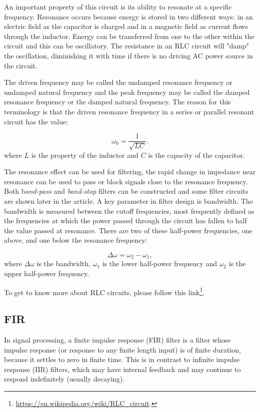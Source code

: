 \documentclass[12pt]{article}
\theoremstyle{plain}
\begin{document}
An important property of this circuit is its ability to resonate at a specific frequency. Resonance occurs because energy is stored in two different ways: in an electric field as the capacitor is charged and in a magnetic field as current flows through the inductor. Energy can be transferred from one to the other within the circuit and this can be oscillatory. The resistance in an RLC circuit will "damp" the oscillation, diminishing it with time if there is no driving AC power source in the circuit. 

The driven frequency may be called the undamped resonance frequency or undamped natural frequency and the peak frequency may be called the damped resonance frequency or the damped natural frequency. The reason for this terminology is that the driven resonance frequency in a series or parallel resonant circuit has the value:

\begin{equation}
\omega_0 = \frac{1}{\sqrt{LC}}.
\end{equation}
where $L$ is the property of the inductor and $C$ is the capacity of the capacitor. 

The resonance effect can be used for filtering, the rapid change in impedance near resonance can be used to pass or block signals close to the resonance frequency. Both b\textit{and-pass} and \textit{band-stop} filters can be constructed and some filter circuits are shown later in the article. A key parameter in filter design is bandwidth. The bandwidth is measured between the cutoff frequencies, most frequently defined as the frequencies at which the power passed through the circuit has fallen to half the value passed at resonance. There are two of these half-power frequencies, one above, and one below the resonance frequency:

\begin{equation}
\Delta \omega = \omega_2 - \omega_1,
\end{equation}
where $\Delta \omega$ is the bandwidth, $\omega_1$ is the lower half-power frequency and $\omega_2$ is the upper half-power frequency.

To get to know more about RLC circuits, please follow this link\footnote{\url{https://en.wikipedia.org/wiki/RLC_circuit}.}.

\subsection{FIR}

In signal processing, a finite impulse response (FIR) filter is a filter whose impulse response (or response to any finite length input) is of finite duration, because it settles to zero in finite time. This is in contrast to infinite impulse response (IIR) filters, which may have internal feedback and may continue to respond indefinitely (usually decaying).
\end{document}
